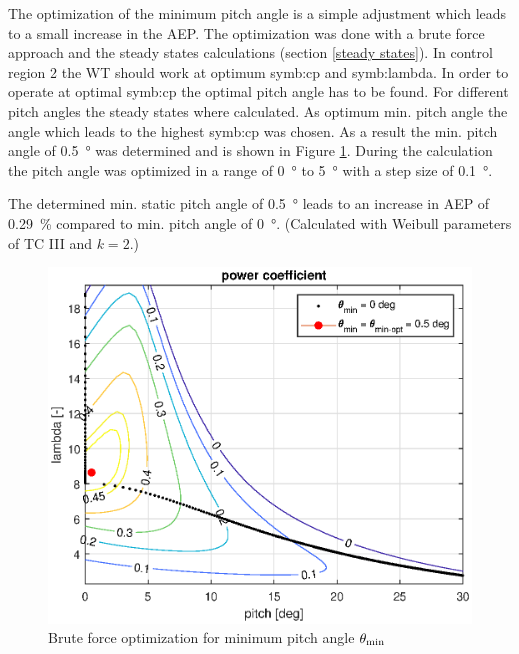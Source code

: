 The optimization of the minimum pitch angle is a simple adjustment which leads to a small increase in the AEP. 
The optimization was done with a brute force approach and the steady states calculations (section \ref{steady states}). 
In control region 2 the WT should work at optimum \gls{symb:cp} and \gls{symb:lambda}.
In order to operate at optimal \gls{symb:cp} the optimal pitch angle has to be found.
For different pitch angles the steady states where calculated. 
As optimum min. pitch angle the angle which leads to the highest \gls{symb:cp} was chosen. 
As a result the min. pitch angle of \SI{0.5}{\degree} was determined and is shown in Figure \ref{fig:theta min general}. 
During the calculation the pitch angle was optimized in a range of \SI{0}{\degree} to \SI{5}{\degree} with a step size of \SI{0.1}{\degree}.

The determined min. static pitch angle of \SI{0.5}{\degree} leads to an increase in AEP of \SI{0.29}{\%} compared to min. pitch angle of \SI{0}{\degree}. 
(Calculated with Weibull parameters of TC III and $k=2$.)

\begin{figure}[h]
	\centering	
	\includegraphics[width=12cm]{Figures/ThetaMinOpt}
	\caption{Brute force optimization for minimum pitch angle $\theta_\textnormal{min}$}
	\label{fig:theta min general}
\end{figure}